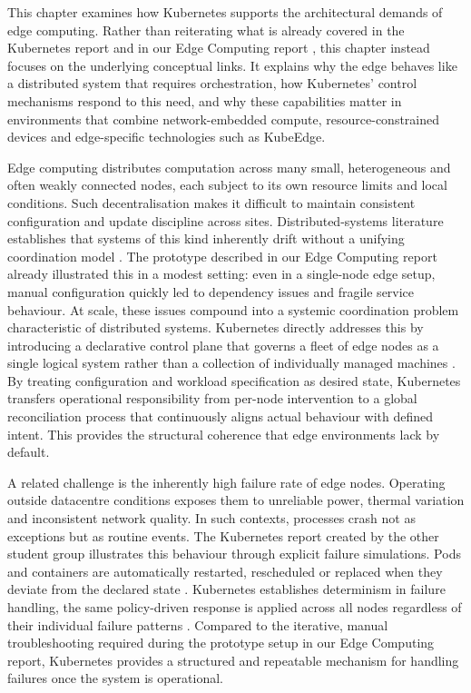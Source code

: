 This chapter examines how Kubernetes supports the architectural demands of edge computing. Rather than reiterating what is already covered in the Kubernetes report \cite{kubernetes_report} and in our Edge Computing report \cite{edge_computing_report}, this chapter instead focuses on the underlying conceptual links. It explains why the edge behaves like a distributed system that requires orchestration, how Kubernetes’ control mechanisms respond to this need, and why these capabilities matter in environments that combine network-embedded compute, resource-constrained devices and edge-specific technologies such as KubeEdge.

Edge computing distributes computation across many small, heterogeneous and often weakly connected nodes, each subject to its own resource limits and local conditions. Such decentralisation makes it difficult to maintain consistent configuration and update discipline across sites. Distributed-systems literature establishes that systems of this kind inherently drift without a unifying coordination model \cite{vansteen_tanenbaum_distributed_systems}. The prototype described in our Edge Computing report already illustrated this in a modest setting: even in a single-node edge setup, manual configuration quickly led to dependency issues and fragile service behaviour. At scale, these issues compound into a systemic coordination problem characteristic of distributed systems. Kubernetes directly addresses this by introducing a declarative control plane that governs a fleet of edge nodes as a single logical system rather than a collection of individually managed machines \cite{k8s_architecture, brewer_kubernetes_design}. By treating configuration and workload specification as desired state, Kubernetes transfers operational responsibility from per-node intervention to a global reconciliation process that continuously aligns actual behaviour with defined intent. This provides the structural coherence that edge environments lack by default.

A related challenge is the inherently high failure rate of edge nodes. Operating outside datacentre conditions exposes them to unreliable power, thermal variation and inconsistent network quality. In such contexts, processes crash not as exceptions but as routine events. The Kubernetes report created by the other student group illustrates this behaviour through explicit failure simulations. Pods and containers are automatically restarted, rescheduled or replaced when they deviate from the declared state \cite{kubernetes_report}. Kubernetes establishes determinism in failure handling, the same policy-driven response is applied across all nodes regardless of their individual failure patterns \cite{brewer_kubernetes_design}. Compared to the iterative, manual troubleshooting required during the prototype setup in our Edge Computing report, Kubernetes provides a structured and repeatable mechanism for handling failures once the system is operational.


